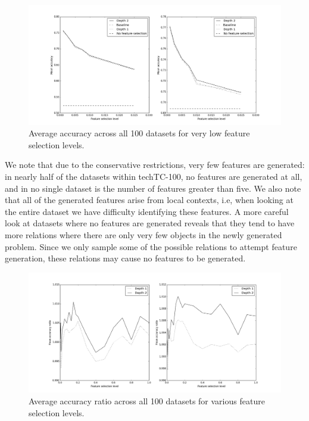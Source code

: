 \documentclass{article}
\theoremstyle{definition}
\begin{document}
\begin{figure}[h!]
	\centering
	\includegraphics[scale=0.4, keepaspectratio=true]{accuracy_low.png}
	\caption{Average accuracy across all 100 datasets for very low feature selection levels.}
	\label{fig:accuracy_low}
\end{figure}

We note that due to the conservative restrictions, very few features are generated: in nearly half of the datasets within techTC-100, no features are generated at all, and in no single dataset is the number of features greater than five. We also note that all of the generated features arise from local contexts, i.e, when looking at the entire dataset we have difficulty identifying these features. A more careful look at datasets where no features are generated reveals that they tend to have more relations where there are only very few objects in the newly generated problem. Since we only sample some of the possible relations to attempt feature generation, these relations may cause no features to be generated.

\begin{figure}[h!]
	\centering
	\includegraphics[scale=0.4, keepaspectratio=true]{ratios.png}
	\caption{Average accuracy ratio across all 100 datasets for various feature selection levels.}
	\label{fig:ratios}
\end{figure}
\end{document}
